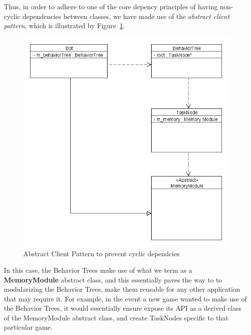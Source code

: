     \pagebreak
    
    Thus, in order to adhere to one of the core depency principles of having non-cyclic dependencies between classes, we have made use of the \emph{abstract client pattern}, which is illustrated by Figure~\ref{img:abstractclient}.
    
    \begin{figure}[h]                
        \begin{center}
            \includegraphics[scale=0.3]{images/uml_sysdesign.jpg}
            \caption{Abstract Client Pattern to prevent cyclic dependcies}
            \label{img:abstractclient}
        \end{center}            
    \end{figure}
    
    In this case, the Behavior Trees make use of what we term as a \textbf{MemoryModule} abstract class, and this essentially paves the way to to modularizing the Behavior Trees, make them reusable for any other application that may require it. For example, in the event a new game wanted to make use of the Behavior Trees, it would essentially ensure expose its API as a derived class of the MemoryModule abstract class, and create TaskNodes specific to that particular game.
    
    \newpage
    

